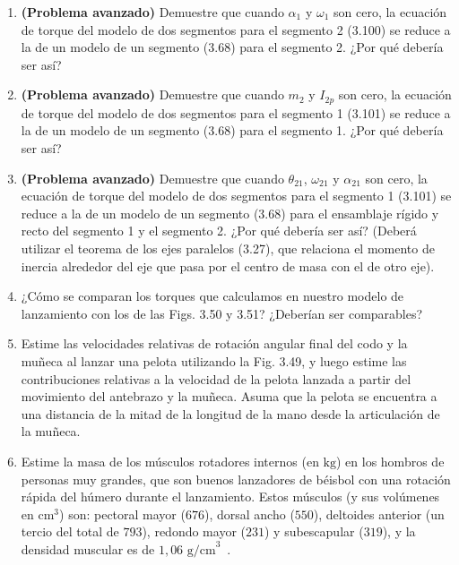 \documentclass[12pt]{book}
\begin{document}
\begin{enumerate}
\item[3.81] \textbf{(Problema avanzado)} Demuestre que cuando $\alpha_1$ y $\omega_1$ son cero, la ecuación de torque del modelo de dos segmentos para el segmento 2 (3.100) se reduce a la de un modelo de un segmento (3.68) para el segmento 2. ¿Por qué debería ser así?

\item[3.82] \textbf{(Problema avanzado)} Demuestre que cuando $m_2$ y $I_{2p}$ son cero, la ecuación de torque del modelo de dos segmentos para el segmento 1 (3.101) se reduce a la de un modelo de un segmento (3.68) para el segmento 1. ¿Por qué debería ser así?

\item[3.83] \textbf{(Problema avanzado)} Demuestre que cuando $\theta_{21}$, $\omega_{21}$ y $\alpha_{21}$ son cero, la ecuación de torque del modelo de dos segmentos para el segmento 1 (3.101) se reduce a la de un modelo de un segmento (3.68) para el ensamblaje rígido y recto del segmento 1 y el segmento 2. ¿Por qué debería ser así? (Deberá utilizar el teorema de los ejes paralelos (3.27), que relaciona el momento de inercia alrededor del eje que pasa por el centro de masa con el de otro eje).

\item[3.84] ¿Cómo se comparan los torques que calculamos en nuestro modelo de lanzamiento con los de las Figs. 3.50 y 3.51? ¿Deberían ser comparables?

\item[3.85] Estime las velocidades relativas de rotación angular final del codo y la muñeca al lanzar una pelota utilizando la Fig. 3.49, y luego estime las contribuciones relativas a la velocidad de la pelota lanzada a partir del movimiento del antebrazo y la muñeca. Asuma que la pelota se encuentra a una distancia de la mitad de la longitud de la mano desde la articulación de la muñeca.

\item[3.86] Estime la masa de los músculos rotadores internos (en $\text{kg}$) en los hombros de personas muy grandes, que son buenos lanzadores de béisbol con una rotación rápida del húmero durante el lanzamiento. Estos músculos (y sus volúmenes en $\text{cm}^3$) son: pectoral mayor ($676$), dorsal ancho ($550$), deltoides anterior (un tercio del total de $793$), redondo mayor ($231$) y subescapular ($319$), y la densidad muscular es de $1{,}06\text{ g/cm}^3$~\cite{ref121}.


\end{enumerate}
\end{document}

